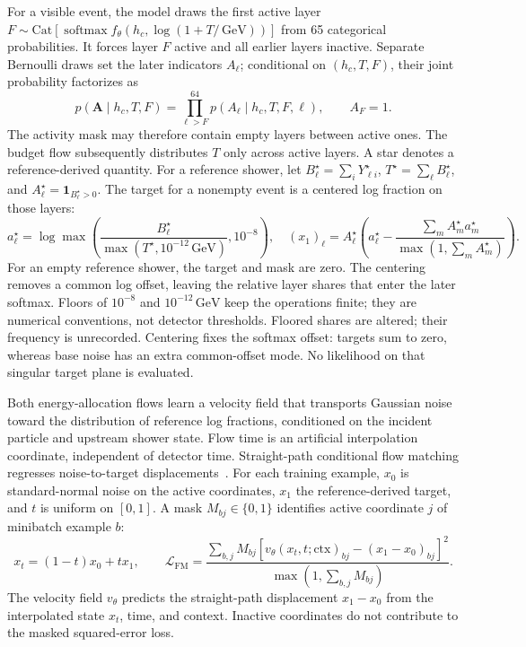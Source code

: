 \documentclass[11pt]{article}
\newcommand{\GeV}{\,\mathrm{GeV}}
\begin{document}
For a visible event, the model draws the first active layer $F\sim\mathrm{Cat}[\operatorname{softmax}f_\theta(h_c,\log(1+T/\GeV))]$ from 65 categorical probabilities. It forces layer $F$ active and all earlier layers inactive. Separate Bernoulli draws set the later indicators $A_\ell$; conditional on $(h_c,T,F)$, their joint probability factorizes as
\begin{equation}
 p(\mathbf A\mid h_c,T,F)=\prod_{\ell>F}^{64}p(A_\ell\mid h_c,T,F,\ell),
 \qquad A_F=1.
 \label{eq:activity}
\end{equation}
The activity mask may therefore contain empty layers between active ones. The budget flow subsequently distributes $T$ only across active layers. A star denotes a reference-derived quantity. For a reference shower, let $B_\ell^\star=\sum_iY_{\ell i}^\star$, $T^\star=\sum_\ell B_\ell^\star$, and $A_\ell^\star=\mathbf 1_{B_\ell^\star>0}$. The target for a nonempty event is a centered log fraction on those layers:
\begin{equation}
 a_\ell^\star=\log\max\!\left(
 \frac{B_\ell^\star}{\max(T^\star,10^{-12}\GeV)},10^{-8}\right),
 \quad (x_1)_\ell=A_\ell^\star\left(
 a_\ell^\star-\frac{\sum_m A_m^\star a_m^\star}
 {\max(1,\sum_m A_m^\star)}\right).
 \label{eq:profile_target}
\end{equation}
For an empty reference shower, the target and mask are zero. The centering removes a common log offset, leaving the relative layer shares that enter the later softmax. Floors of $10^{-8}$ and $10^{-12}\GeV$ keep the operations finite; they are numerical conventions, not detector thresholds. Floored shares are altered; their frequency is unrecorded. Centering fixes the softmax offset: targets sum to zero, whereas base noise has an extra common-offset mode. No likelihood on that singular target plane is evaluated.

Both energy-allocation flows learn a velocity field that transports Gaussian noise toward the distribution of reference log fractions, conditioned on the incident particle and upstream shower state. Flow time is an artificial interpolation coordinate, independent of detector time. Straight-path conditional flow matching regresses noise-to-target displacements~\cite{flowmatching,rectifiedflow}. For each training example, $x_0$ is standard-normal noise on the active coordinates, $x_1$ the reference-derived target, and $t$ is uniform on $[0,1]$. A mask $M_{bj}\in\{0,1\}$ identifies active coordinate $j$ of minibatch example $b$:
\begin{equation}
 x_t=(1-t)x_0+t x_1,\qquad
 \mathcal L_{\mathrm{FM}}=
 \frac{\sum_{b,j}M_{bj}
 [v_\theta(x_t,t;\mathrm{ctx})_{bj}-(x_1-x_0)_{bj}]^2}
 {\max(1,\sum_{b,j}M_{bj})}.
 \label{eq:cfm}
\end{equation}
The velocity field $v_\theta$ predicts the straight-path displacement $x_1-x_0$ from the interpolated state $x_t$, time, and context. Inactive coordinates do not contribute to the masked squared-error loss.
\end{document}
